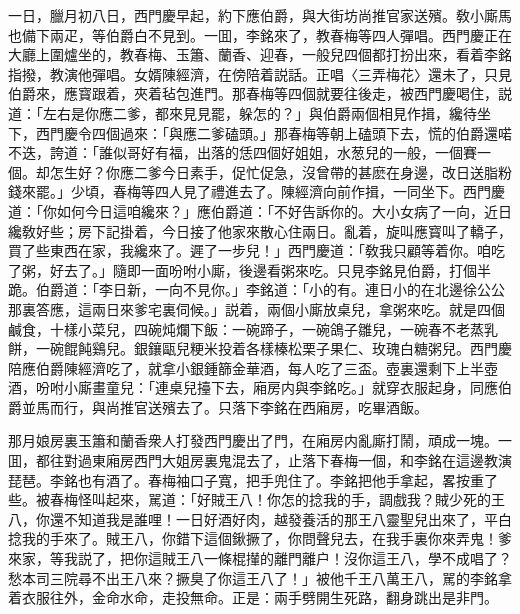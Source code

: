 一日，臘月初八日，西門慶早起，約下應伯爵，與大街坊尚推官家送殯。敎小廝馬也備下兩疋，等伯爵白不見到。一囬，李銘來了，教春梅等四人彈唱。西門慶正在大廳上圍爐坐的，教春梅、玉簫、蘭香、迎春，一般兒四個都打扮出來，看着李銘指撥，教演他彈唱。女婿陳經濟，在傍陪着説話。正唱〈三弄梅花〉還未了，只見伯爵來，應寳跟着，夾着毡包進門。那春梅等四個就要往後走，被西門慶喝住，説道：「左右是你應二爹，都來見見罷，躲怎的？」與伯爵兩個相見作揖，纔待坐下，西門慶令四個過來：「與應二爹磕頭。」那春梅等朝上磕頭下去，慌的伯爵還喏不迭，誇道：「誰似哥好有福，出落的恁四個好姐姐，水葱兒的一般，一個賽一個。却怎生好？你應二爹今日素手，促忙促急，沒曾帶的甚麽在身邊，改日送脂粉錢來罷。」少頃，春梅等四人見了禮進去了。陳經濟向前作揖，一同坐下。西門慶道：「你如何今日這咱纔來？」應伯爵道：「不好告訴你的。大小女病了一向，近日纔敎好些；房下記掛着，今日接了他家來散心住兩日。亂着，旋叫應寳叫了轎子，買了些東西在家，我纔來了。遲了一步兒！」西門慶道：「敎我只顧等着你。咱吃了粥，好去了。」隨即一面吩咐小廝，後邊看粥來吃。只見李銘見伯爵，打個半跪。伯爵道：「李日新，一向不見你。」李銘道：「小的有。連日小的在北邊徐公公那裏答應，這兩日來爹宅裏伺候。」説着，兩個小廝放桌兒，拿粥來吃。就是四個鹹食，十樣小菜兒，四碗炖爛下飯：一碗蹄子，一碗鴿子雛兒，一碗春不老蒸乳餅，一碗餛飩鷄兒。銀鑲甌兒粳米投着各樣榛松栗子果仁、玫瑰白糖粥兒。西門慶陪應伯爵陳經濟吃了，就拿小銀鍾篩金華酒，每人吃了三盃。壺裏還剩下上半壺酒，吩咐小廝畫童兒：「連桌兒擡下去，廂房内與李銘吃。」就穿衣服起身，同應伯爵並馬而行，與尚推官送殯去了。只落下李銘在西廂房，吃畢酒飯。

那月娘房裏玉簫和蘭香衆人打發西門慶出了門，在廂房内亂廝打鬧，頑成一塊。一囬，都往對過東廂房西門大姐房裏鬼混去了，止落下春梅一個，和李銘在這邊教演琵琶。李銘也有酒了。春梅袖口子寬，把手兜住了。李銘把他手拿起，畧按重了些。被春梅怪叫起來，駡道：「好賊王八！你怎的捻我的手，調戲我？賊少死的王八，你還不知道我是誰哩！一日好酒好肉，越發養活的那王八靈聖兒出來了，平白捻我的手來了。賊王八，你錯下這個鍬撅了，你問聲兒去，在我手裏你來弄鬼！爹來家，等我説了，把你這賊王八一條棍攆的離門離户！沒你這王八，學不成唱了？愁本司三院尋不出王八來？撅臭了你這王八了！」被他千王八萬王八，駡的李銘拿着衣服往外，金命水命，走投無命。正是：兩手劈開生死路，翻身跳出是非門。

